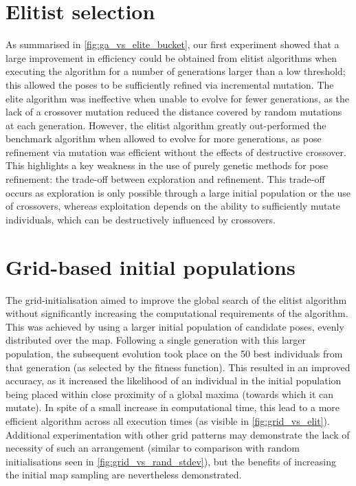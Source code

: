 \documentclass[authoryearcitations]{UoYCSproject}
\begin{document}
\section{Elitist selection}
\label{sec:summary_elitist_selection}
As summarised in \autoref{fig:ga_vs_elite_bucket}, our first experiment showed that a large improvement in efficiency could be obtained from elitist algorithms when executing the algorithm for a number of generations larger than a low threshold; this allowed the poses to be sufficiently refined via incremental mutation. The elite algorithm was ineffective when unable to evolve for fewer generations, as the lack of a crossover mutation reduced the distance covered by random mutations at each generation. However, the elitist algorithm greatly out-performed the benchmark algorithm when allowed to evolve for more generations, as pose refinement via mutation was efficient without the effects of destructive crossover. This highlights a key weakness in the use of purely genetic methods for pose refinement: the trade-off between exploration and refinement. This trade-off occurs as exploration is only possible through a large initial population or the use of crossovers, whereas exploitation depends on the ability to sufficiently mutate individuals, which can be destructively influenced by crossovers.


\section{Grid-based initial populations}
\label{sec:summary_grid_based_init}
The grid-initialisation aimed to improve the global search of the elitist algorithm without significantly increasing the computational requirements of the algorithm. This was achieved by using a larger initial population of candidate poses, evenly distributed over the map. Following a single generation with this larger population, the subsequent evolution took place on the 50 best individuals from that generation (as selected by the fitness function). This resulted in an improved accuracy, as it increased the likelihood of an individual in the initial population being placed within close proximity of a global maxima (towards which it can mutate). In spite of a small increase in computational time, this lead to a more efficient algorithm across all execution times (as visible in \autoref{fig:grid_vs_elit}). Additional experimentation with other grid patterns may demonstrate the lack of necessity of such an arrangement (similar to comparison with random initialisations seen in \autoref{fig:grid_vs_rand_stdev}), but the benefits of increasing the initial map sampling are nevertheless demonstrated.
\end{document}
